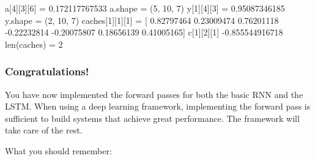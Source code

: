 \documentclass[11pt]{article}
\newenvironment{Shaded}{}{}
\newcommand{\DecValTok}[1]{\textcolor[rgb]{0.25,0.63,0.44}{{#1}}}
\newcommand{\FloatTok}[1]{\textcolor[rgb]{0.25,0.63,0.44}{{#1}}}
\newcommand{\NormalTok}[1]{{#1}}
\newcommand{\OperatorTok}[1]{\textcolor[rgb]{0.40,0.40,0.40}{{#1}}}
\newcommand{\BuiltInTok}[1]{{#1}}
\begin{document}
\begin{Shaded}
\begin{Highlighting}[]
\NormalTok{a[}\DecValTok{4}\NormalTok{][}\DecValTok{3}\NormalTok{][}\DecValTok{6}\NormalTok{] }\OperatorTok{=}  \FloatTok{0.172117767533}
\NormalTok{a.shape }\OperatorTok{=}\NormalTok{  (}\DecValTok{5}\NormalTok{, }\DecValTok{10}\NormalTok{, }\DecValTok{7}\NormalTok{)}
\NormalTok{y[}\DecValTok{1}\NormalTok{][}\DecValTok{4}\NormalTok{][}\DecValTok{3}\NormalTok{] }\OperatorTok{=} \FloatTok{0.95087346185}
\NormalTok{y.shape }\OperatorTok{=}\NormalTok{  (}\DecValTok{2}\NormalTok{, }\DecValTok{10}\NormalTok{, }\DecValTok{7}\NormalTok{)}
\NormalTok{caches[}\DecValTok{1}\NormalTok{][}\DecValTok{1}\NormalTok{][}\DecValTok{1}\NormalTok{] }\OperatorTok{=}
\NormalTok{ [ }\FloatTok{0.82797464}  \FloatTok{0.23009474}  \FloatTok{0.76201118} \OperatorTok{{-}}\FloatTok{0.22232814} \OperatorTok{{-}}\FloatTok{0.20075807}  \FloatTok{0.18656139}
  \FloatTok{0.41005165}\NormalTok{]}
\NormalTok{c[}\DecValTok{1}\NormalTok{][}\DecValTok{2}\NormalTok{][}\DecValTok{1}\NormalTok{] }\OperatorTok{{-}}\FloatTok{0.855544916718}
\BuiltInTok{len}\NormalTok{(caches) }\OperatorTok{=}  \DecValTok{2}
\end{Highlighting}
\end{Shaded}

    \hypertarget{congratulations}{%
\subsubsection{Congratulations!}\label{congratulations}}

You have now implemented the forward passes for both the basic RNN and
the LSTM. When using a deep learning framework, implementing the forward
pass is sufficient to build systems that achieve great performance. The
framework will take care of the rest.

What you should remember:
\end{document}
